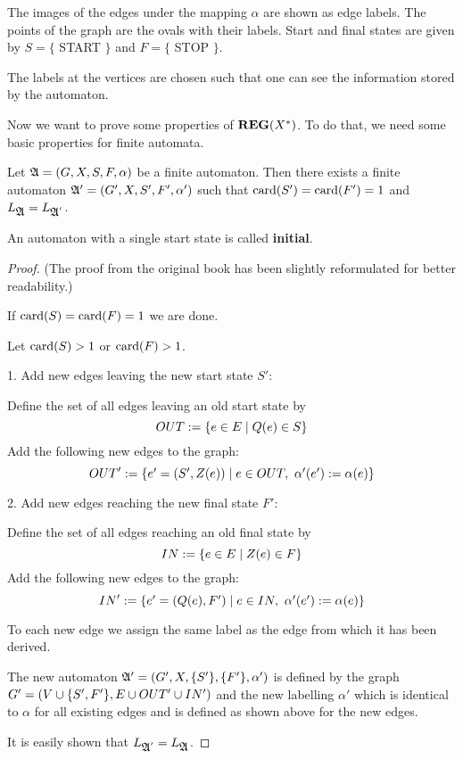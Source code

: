 The images of the edges under the mapping $\alpha$ are shown as edge labels. The
points of the graph are the ovals with their labels. Start and final states are
given by $S = \{$ START $\}$ and $F = \{$ STOP $\}$.

The labels at the vertices are chosen such that one can see the information
stored by the automaton.

Now we want to prove some properties of $\mbox{{\bf REG}}(X^*)$. To do that, we need
some basic properties for finite automata.

\begin{lemma}
Let $\mbox{$\mathfrak{A}$} = (G, X, S, F, \alpha)$ be a finite automaton. Then there
exists a finite automaton $\mbox{$\mathfrak{A'}$} = (G', X, S', F', \alpha')$ such that
$\mathrm{card}({S'}) = \mathrm{card}({F'}) = 1$ and $L_{\mbox{$\mathfrak{A}$}} = L_{\mbox{$\mathfrak{A}$}'}$.
\end{lemma}

An automaton with a single start state is called {\bf initial}.

\begin{proof}
(The proof from the original book has been slightly reformulated for better
readability.)

If $\mathrm{card}({S}) = \mathrm{card}({F}) = 1$ we are done.

Let $\mathrm{card}({S}) > 1$ or $\mathrm{card}({F}) > 1$.

1. Add new edges leaving the new start state $S'$:

Define the set of all edges leaving an old start state by
\[ OUT := \mbox{$\{e \in E \mid Q(e) \in S\}$} \]
Add the following new edges to the graph:
\[ OUT' := \setof{e' = (S', Z(e)) \mid e \in OUT,\ \alpha'(e') := \alpha(e)} \]

2. Add new edges reaching the new final state $F'$:

Define the set of all edges reaching an old final state by
\[ IN := \mbox{$\{e \in E \mid Z(e) \in F\}$} \]
Add the following new edges to the graph:
\[ IN' := \setof{e' = (Q(e), F') \mid e \in IN,\ \alpha'(e') := \alpha(e)} \]

To each new edge we assign the same label as the edge from which it has been
derived.

The new automaton $\mbox{$\mathfrak{A'}$} = (G', X, \mbox{$\{S'\}$}, \mbox{$\{F'\}$}, \alpha')$ is
defined by the graph $G' = (V \cup \mbox{$\{S', F'\}$}, E \cup OUT' \cup IN')$
and the new labelling $\alpha'$ which is identical to $\alpha$ for all existing 
edges and is defined as shown above for the new edges.

It is easily shown that $L_{\mbox{$\mathfrak{A}$}'} = L_{\mbox{$\mathfrak{A}$}}$.
\end{proof}

